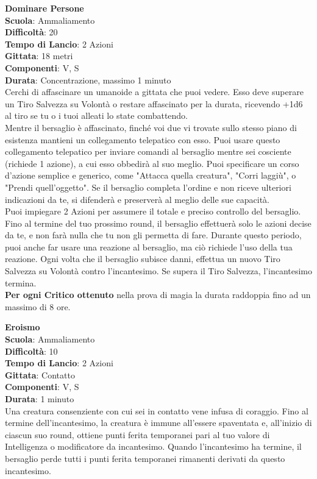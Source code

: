 \begin{multicols}{2}
\medskip\textbf{Dominare Persone}\\
\textbf{Scuola}: Ammaliamento\\
\textbf{Difficoltà}: 20\\
\textbf{Tempo di Lancio}: 2 Azioni\\
\textbf{Gittata}: 18 metri\\
\textbf{Componenti}: V, S\\
\textbf{Durata}: Concentrazione, massimo 1 minuto\\
Cerchi di affascinare un umanoide a gittata che puoi vedere. Esso deve superare un Tiro Salvezza su Volontà o restare affascinato per la durata, ricevendo +1d6 al tiro se tu o i tuoi alleati lo state combattendo.\\
Mentre il bersaglio è affascinato, finché voi due vi trovate sullo stesso piano di esistenza mantieni un collegamento telepatico con esso. Puoi usare questo collegamento telepatico per inviare comandi al bersaglio mentre sei cosciente (richiede 1 azione), a cui esso obbedirà al suo meglio. Puoi specificare un corso d'azione semplice e generico, come "Attacca quella creatura", "Corri laggiù", o "Prendi quell'oggetto". Se il bersaglio completa l'ordine e non riceve ulteriori indicazioni da te, si difenderà e preserverà al meglio delle sue capacità.\\
Puoi impiegare 2 Azioni per assumere il totale e preciso controllo del bersaglio. Fino al termine del tuo prossimo round, il bersaglio effettuerà solo le azioni decise da te, e non farà nulla che tu non gli permetta di fare. Durante questo periodo, puoi anche far usare una reazione al bersaglio, ma ciò richiede l'uso della tua reazione. Ogni volta che il bersaglio subisce danni, effettua un nuovo Tiro Salvezza su Volontà contro l'incantesimo. Se supera il Tiro Salvezza, l'incantesimo termina.\\
\textbf{Per ogni Critico ottenuto} nella prova di magia la durata raddoppia fino ad un massimo di 8 ore.

\medskip\textbf{Eroismo}\\
\textbf{Scuola}: Ammaliamento\\
\textbf{Difficoltà}: 10\\
\textbf{Tempo di Lancio}: 2 Azioni\\
\textbf{Gittata}: Contatto\\
\textbf{Componenti}: V, S\\
\textbf{Durata}: 1 minuto\\
Una creatura consenziente con cui sei in contatto vene infusa di coraggio. Fino al termine dell'incantesimo, la creatura è immune all'essere spaventata e, all'inizio di ciascun suo round, ottiene punti ferita temporanei pari al tuo valore di Intelligenza o modificatore da incantesimo. Quando l'incantesimo ha termine, il bersaglio perde tutti i punti ferita temporanei rimanenti derivati da questo incantesimo.


\end{multicols}
